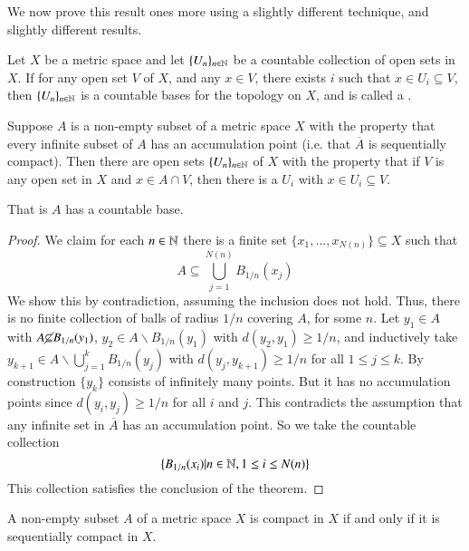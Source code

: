 We now prove this result ones more using a slightly different technique, and slightly different results. 

\begin{definition}
    Let $X$ be a metric space and let $\{U_n\}_{n \in \mathbb N}$ be a countable collection of open sets in $X$. If for any open set $V$ of $X$, and any $x \in V$, there exists $i$ such that $x \in U_i \subseteq V$, then $\{U_n\}_{n\in\mathbb N}$ is a countable bases for the topology on $X$, and is called a .
\end{definition}

\begin{lemma}
    Suppose $A$ is a non-empty subset of a metric space $X$ with the property that every infinite subset of $A$ has an accumulation point (i.e. that $\overline{A}$ is sequentially compact). Then there are open sets $\{U_n\}_{n \in \mathbb N}$ of $X$ with the property that if $V$ is any open set in $X$ and $x \in A \cap V$, then there is a $U_i$ with $x \in U_i \subseteq V$.
\end{lemma}
That is $A$ has a countable base.
\begin{proof}
    We claim for each $n \in \mathbb N$ there is a finite set $\{x_1,...,x_{N(n)}\}\subseteq X$ such that $$A \subseteq \bigcup_{j=1}^{N(n)}B_{1/n}(x_j)$$ We show this by contradiction, assuming the inclusion does not hold. Thus, there is no finite collection of balls of radius $1/n$ covering $A$, for some $n$. Let $y_1 \in A$ with $A \cancel{\subseteq}B_{1/n}(y_1)$, $y_2 \in A\backslash B_{1/n}(y_1)$ with $d(y_2,y_1) \geq 1/n$, and inductively take $y_{k+1} \in A\backslash\bigcup_{j=1}^kB_{1/n}(y_j)$ with $d(y_j,y_{k+1}) \geq 1/n$ for all $1 \leq j \leq k$. By construction $\{y_k\}$ consists of infinitely many points. But it has no accumulation points since $d(y_i,y_j) \geq 1/n$ for all $i$ and $j$. This contradicts the assumption that any infinite set in $\overline{A}$ has an accumulation point. So we take the countable collection $$\{B_{1/n}(x_i)\vert n \in \mathbb N,1 \leq i \leq N(n)\}$$ This collection satisfies the conclusion of the theorem.
\end{proof}

\begin{theorem}
    A non-empty subset $A$ of a metric space $X$ is compact in $X$ if and only if it is sequentially compact in $X$.
\end{theorem}

